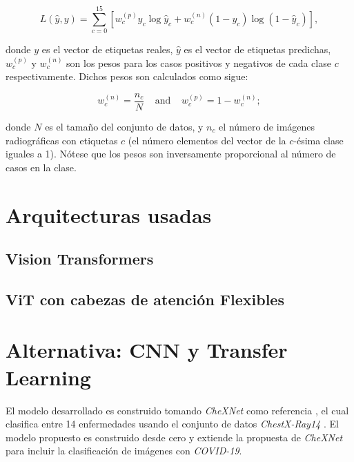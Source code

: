 {\begin{equation} \label{eq:loss}
    L(\hat y, y) = \sum_{c=0}^{15} \left[ w_c^{(p)} y_c \log \hat y_c  + w_c^{(n)}  (1-y_c) \log  (1- \hat y_c)  \right],
\end{equation}

donde $y$ es el vector de etiquetas reales, $\hat y$ es el vector de etiquetas predichas,
$w_c^{(p)}$ y $w_c^{(n)}$ son los pesos para los casos positivos y negativos de cada clase $c$
respectivamente. Dichos pesos son calculados como sigue:

\begin{equation}\label{eq:weights}
    w_c^{(n)} = \frac{n_c}{N} \;\;\;\;\text{and}\;\;\;\;   w_c^{(p)} = 1-  w_c^{(n)};
\end{equation}

donde $N$ es el tamaño del conjunto de datos, y $n_c$ el número de imágenes radiográficas con
etiquetas $c$ (el número elementos del vector de la $c$-ésima clase iguales a 1). Nótese que los
pesos son inversamente proporcional al número de casos en la clase.


\section{Arquitecturas usadas}
\subsection{Vision Transformers}
\subsection{ViT con cabezas de atención Flexibles}

\section{Alternativa: CNN y Transfer Learning}

El modelo desarrollado es construido tomando \textit{CheXNet} como referencia
\cite{rajpurkar2018deep}, el cual clasifica entre 14 enfermedades
usando el conjunto de datos \textit{ChestX-Ray14} \cite{wang2017chestx}. El modelo propuesto es
construido desde cero y extiende la propuesta de \textit{CheXNet} para incluir la clasificación de
imágenes con \textit{COVID-19}.

}
